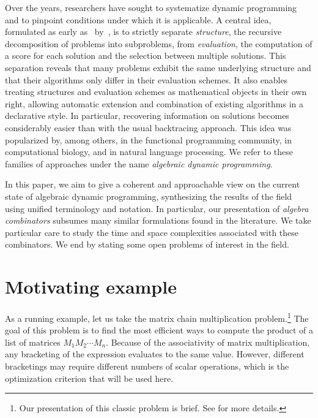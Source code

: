 
Over the years, researchers have sought to systematize dynamic programming and to pinpoint conditions under which it is applicable.
A central idea, formulated as early as~\citeyear{Helman1985ComprehensiveModelDynamic} by~\textcite{Helman1985ComprehensiveModelDynamic}, is to strictly separate \emph{structure}, the recursive decomposition of problems into subproblems, from \emph{evaluation}, the computation of a score for each solution and the selection between multiple solutions.
This separation reveals that many problems exhibit the same underlying structure and that their algorithms only differ in their evaluation schemes.
It also enables treating structures and evaluation schemes as mathematical objects in their own right, allowing automatic extension and combination of existing algorithms in a declarative style.
In particular, recovering information on solutions becomes considerably easier than with the usual backtracing approach.
This idea was popularized by, among others,
\textcite{DeMoor1999DynamicProgrammingSoftware} in the functional programming community,
\textcite{Giegerich2004DisciplineDynamicProgramming} in computational biology,
and \textcite{Huang2008AdvancedDynamicProgramming} in natural language processing.
We refer to these families of approaches under the name \emph{algebraic dynamic programming}.

In this paper, we aim to give a coherent and approachable view on the current state of algebraic dynamic programming, synthesizing the results of the field using unified terminology and notation.
In particular, our presentation of \emph{algebra combinators} subsumes many similar formulations found in the literature.
We take particular care to study the time and space complexities associated with these combinators.
We end by stating some open problems of interest in the field.

\section{Motivating example}

As a running example, let us take the matrix chain multiplication problem.\footnote{Our presentation of this classic problem is brief. See \textcite[§14.2]{Cormen2022IntroductionAlgorithms} for more details.}
The goal of this problem is to find the most efficient ways to compute the product of a list of matrices \(M_1 M_2 \cdots M_n\).
Because of the associativity of matrix multiplication, any bracketing of the expression evaluates to the same value.
However, different bracketings may require different numbers of scalar operations, which is the optimization criterion that will be used here.

